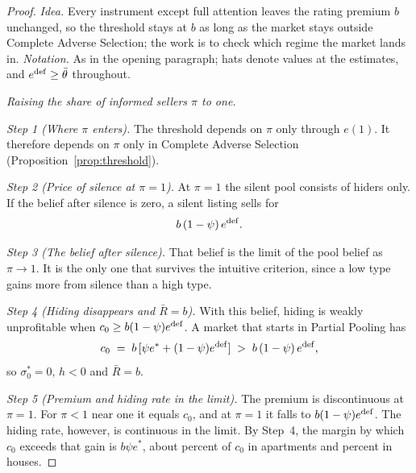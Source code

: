 \begin{proof}\upshape
\emph{Idea.} Every instrument except full attention leaves the rating premium $b$ unchanged, so the threshold stays at $b$ as long as the market stays outside Complete Adverse Selection; the work is to check which regime the market lands in. \emph{Notation.} As in the opening paragraph; hats denote values at the estimates, and $e^{\rm def}\ge\bar\theta$ throughout.

\medskip\noindent\emph{Raising the share of informed sellers $\pi$ to one.}

\emph{Step 1 (Where $\pi$ enters).} The threshold depends on $\pi$ only through $e(1)$. It therefore depends on $\pi$ only in Complete Adverse Selection (Proposition~\ref{prop:threshold}).

\emph{Step 2 (Price of silence at $\pi=1$).} At $\pi=1$ the silent pool consists of hiders only. If the belief after silence is zero, a silent listing sells for
\begin{equation*}
    b\,(1-\psi)\,e^{\rm def}.
\end{equation*}

\emph{Step 3 (The belief after silence).} That belief is the limit of the pool belief as $\pi\to1$. It is the only one that survives the intuitive criterion, since a low type gains more from silence than a high type.

\emph{Step 4 (Hiding disappears and $\bar R=b$).} With this belief, hiding is weakly unprofitable when $c_0\ge b(1-\psi)e^{\rm def}$. A market that starts in Partial Pooling has
\begin{equation*}
    c_0\;=\;b\,[\psi e^*+(1-\psi)e^{\rm def}]\;>\;b\,(1-\psi)\,e^{\rm def},
\end{equation*}
so $\sigma_0^*=0$, $h<0$ and $\bar R=b$.

\emph{Step 5 (Premium and hiding rate in the limit).} The premium is discontinuous at $\pi=1$. For $\pi<1$ near one it equals $c_0$, and at $\pi=1$ it falls to $b(1-\psi)e^{\rm def}$. The hiding rate, however, is continuous in the limit. By Step~4, the margin by which $c_0$ exceeds that gain is $b\psi e^*$, about \attPiOneMarginApt{} percent of $c_0$ in apartments and \attPiOneMarginHouse{} percent in houses.


\end{proof}
